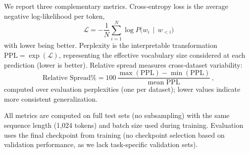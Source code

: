 We report three complementary metrics. Cross‑entropy loss is the average negative log‑likelihood per token,
\begin{equation*}
    \mathcal{L} = -\frac{1}{N}\sum_{i=1}^{N} \log P\bigl(w_i \,\mid\, w_{<i}\bigr)
\end{equation*}
with lower being better. Perplexity is the interpretable transformation $\text{PPL}=\exp(\mathcal{L})$, representing the effective vocabulary size considered at each prediction (lower is better). Relative spread measures cross‑dataset variability:
\begin{equation*}
    \text{Relative Spread}\% = 100\,\frac{\max(\text{PPL}) - \min(\text{PPL})}{\text{mean PPL}}\, ,
\end{equation*}
computed over evaluation perplexities (one per dataset); lower values indicate more consistent generalization.

All metrics are computed on full test sets (no subsampling) with the same sequence length (1,024 tokens) and batch size used during training. Evaluation uses the final checkpoint from training (no checkpoint selection based on validation performance, as we lack task-specific validation sets).
